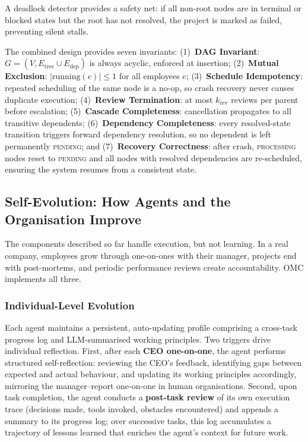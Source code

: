 \documentclass[11pt,a4paper]{article}
\begin{document}
A deadlock detector provides a safety net: if all non-root nodes are in terminal or blocked states but the root has not resolved, the project is marked as failed, preventing silent stalls.

The combined design provides seven invariants: (1)~\textbf{DAG Invariant}: $G = (V, E_{\text{tree}} \cup E_{\text{dep}})$ is always acyclic, enforced at insertion; (2)~\textbf{Mutual Exclusion}: $|\text{running}(e)| \leq 1$ for all employees $e$; (3)~\textbf{Schedule Idempotency}: repeated scheduling of the same node is a no-op, so crash recovery never causes duplicate execution; (4)~\textbf{Review Termination}: at most $k_{\text{rev}}$ reviews per parent before escalation; (5)~\textbf{Cascade Completeness}: cancellation propagates to all transitive dependents; (6)~\textbf{Dependency Completeness}: every resolved-state transition triggers forward dependency resolution, so no dependent is left permanently \textsc{pending}; and (7)~\textbf{Recovery Correctness}: after crash, \textsc{processing} nodes reset to \textsc{pending} and all nodes with resolved dependencies are re-scheduled, ensuring the system resumes from a consistent state.





\subsection{Self-Evolution: How Agents and the Organisation Improve}
\label{sec:self-evolution}

The components described so far handle execution, but not learning.  In a real company, employees grow through one-on-ones with their manager, projects end with post-mortems, and periodic performance reviews create accountability.  OMC implements all three.

\subsubsection{Individual-Level Evolution}

Each agent maintains a persistent, auto-updating profile comprising a cross-task progress log and LLM-summarised working principles.  Two triggers drive individual reflection.  First, after each \textbf{CEO one-on-one}, the agent performs structured self-reflection: reviewing the CEO's feedback, identifying gaps between expected and actual behaviour, and updating its working principles accordingly, mirroring the manager--report one-on-one in human organisations.  Second, upon task completion, the agent conducts a \textbf{post-task review} of its own execution trace (decisions made, tools invoked, obstacles encountered) and appends a summary to its progress log; over successive tasks, this log accumulates a trajectory of lessons learned that enriches the agent's context for future work.
\end{document}
